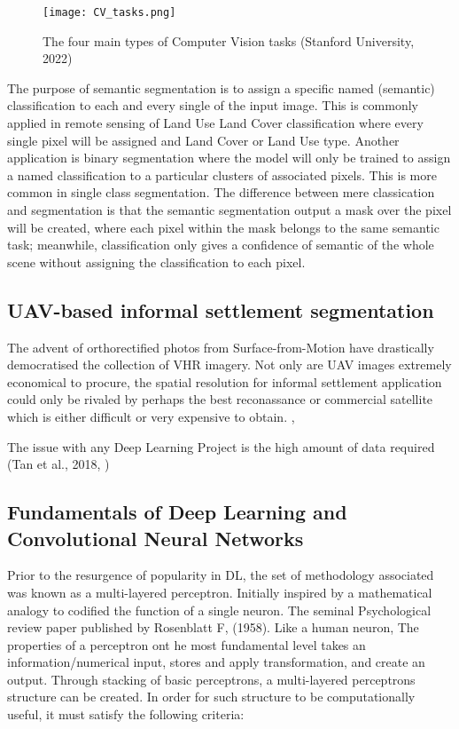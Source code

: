 \documentclass[11pt, a4paper, twoside]{report}
\begin{document}
\begin{figure}[H]
\centering
\texttt{[image: CV\_tasks.png]}
  \caption{The four main types of Computer Vision tasks (Stanford University, 2022)}
\label{fig:CV_tasks}
\end{figure}

The purpose of semantic segmentation is to assign a specific named (semantic) classification to each and every single of the input image. This is commonly applied in remote sensing of Land Use Land Cover classification where every single pixel will be assigned and Land Cover or Land Use type. Another application is binary segmentation where the model will only be trained to assign a named classification to a particular clusters of associated pixels. This is more common in single class segmentation. The difference between mere classication and segmentation is that the semantic segmentation output a mask over the pixel will be created, where each pixel within the mask belongs to the same semantic task; meanwhile, classification only gives a confidence of semantic of the whole scene without assigning the classification to each pixel.


\subsection{UAV-based informal settlement segmentation}\label{CVandCNN}

The advent of orthorectified photos from Surface-from-Motion have drastically democratised the collection of VHR imagery. Not only are UAV images extremely economical to procure, the spatial resolution for informal settlement application could only be rivaled by perhaps the best reconassance or commercial satellite which is either difficult or very expensive to obtain. ,

The issue with any Deep Learning Project is the high amount of data required (Tan et al., 2018, )

\subsection{Fundamentals of Deep Learning and Convolutional Neural Networks}

Prior to the resurgence of popularity in DL, the set of methodology associated was known as a multi-layered perceptron. Initially inspired by a mathematical analogy to codified the function of a single neuron. The seminal Psychological review paper published by Rosenblatt F, (1958). Like a human neuron, The properties of a perceptron ont he most fundamental level takes an information/numerical input, stores and apply transformation, and create an output. Through stacking of basic perceptrons, a multi-layered perceptrons structure can be created. In order for such structure to be computationally useful, it must satisfy the following criteria:
\end{document}
